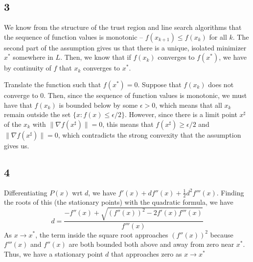 \documentclass{article}
\newcommand{\ep}{\epsilon}
\begin{document}
\subsection*{3}
We know from the structure of the trust region and line search algorithms that the sequence of function values is monotonic -- $f(x_{k+1})\leq f(x_k)$ for all $k$. The second part of the assumption gives us that there is a unique, isolated minimizer $x^*$ somewhere in $L$. Then, we know that if $f(x_k)$ converges to $f(x^*)$, we have by continuity of $f$ that $x_k$ converges to $x^*$.

Translate the function such that $f(x^*)=0$. Suppose that $f(x_k)$ does not converge to $0$. Then, since the sequence of function values is monotonic, we must have that $f(x_k)$ is bounded below by some $\ep>0$, which means that all $x_k$ remain outside the set $\{x: f(x)\leq\ep/2\}$. However, since there is a limit point $x^\sharp$ of the $x_k$ with $\|\nabla f(x^\sharp)\|=0$, this means that $f(x^\sharp)\geq\ep/2$ and $\|\nabla f(x^\sharp)\|=0$, which contradicts the strong convexity that the assumption gives us.
\subsection*{4}
Differentiating $P(x)$ wrt $d$, we have $f'(x)+df''(x)+\frac{1}{2}d^2f'''(x)$. Finding the roots of this (the stationary points) with the quadratic formula, we have 
\[d=\frac{-f''(x)+\sqrt{\left(f''(x)\right)^2-2f'(x)f'''(x)}}{f'''(x)}\]
As $x\to x^*$, the term inside the square root approaches $\left(f''(x)\right)^2$ because $f'''(x)$ and $f''(x)$ are both bounded both above and away from zero near $x^*$. Thus, we have a stationary point $d$ that approaches zero as $x\to x^*$
\end{document}
